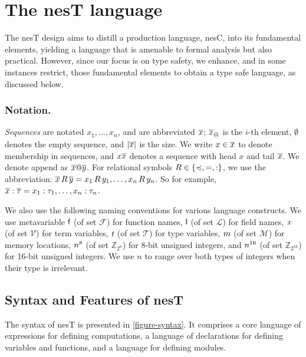 \section{The nesT language}
\label{section-nest}
 
\syntaxfig

The nesT design aims to distill a production language, nesC, into its fundamental elements,
yielding a language that is amenable to formal analysis but also practical. However, since our
focus is on type safety, we enhance, and in some instances restrict, those fundamental elements
to obtain a type safe language, as discussed below.

\subsubsection{Notation.} \emph{Sequences} are notated $x_1,\ldots,x_n$, and are abbreviated
$\overline{x}$; $\overline{x}_{(\mskip -2.5mu i\mskip -2.5mu)}$ is the $i$-th element, $\emptyset$ denotes the empty sequence,
and $|\overline{x}|$ is the size. We write $x \in \overline{x}$ to denote membership in sequences,
and $x\overline{x}$ denotes a sequence with head $x$ and tail $\overline{x}$. We denote append as
$\overline{x}@\overline{y}$. For relational symbols $R \in \{ \preccurlyeq, =, : \}$, we use the
abbreviation: $\overline{x}\, R\, \overline{y} = x_1\, R\, y_1, \ldots, x_n\, R\, y_n$. So for example,
$\overline{x} : \overline{\tau} = x_1 : \tau_1,\ldots,x_n : \tau_n$.

We also use the following naming conventions for various language constructs. We use
metavariable $\textsf{f}$ (of set $\mathcal{F}$) for function names, $\textsf{l}$ (of set
$\mathcal{L}$) for field names, $\textit{x}$ (of set $\mathcal{V}$) for term variables, $\textit{t}$ (of
set $\mathcal{T}$) for type variables, $ m$ (of set $\mathcal{M}$) for memory locations,
$n^{8}$ (of set $\mathbb{Z}_{2^8}$) for 8-bit unsigned integers, and $n^{16}$ (of set
$\mathbb{Z}_{2^{16}}$) for 16-bit unsigned integers. We use $n$ to range over both types of
integers when their type is irrelevant.

\subsection{Syntax and Features of nesT} The syntax of nesT is presented in
\autoref{figure-syntax}. It comprises a core language of expressions for defining computations,
a language of declarations for defining variables and functions, and a language for defining
modules.

\semanticssyntaxfig

